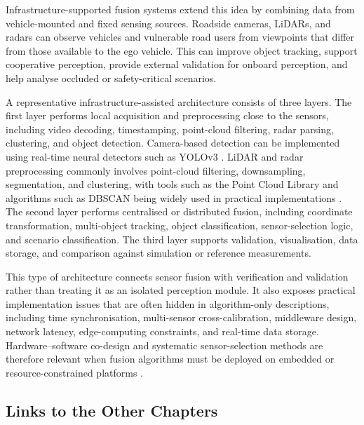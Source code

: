 Infrastructure-supported fusion systems extend this idea by combining data from vehicle-mounted and fixed sensing sources. Roadside cameras, LiDARs, and radars can observe vehicles and vulnerable road users from viewpoints that differ from those available to the ego vehicle. This can improve object tracking, support cooperative perception, provide external validation for onboard perception, and help analyse occluded or safety-critical scenarios.

A representative infrastructure-assisted architecture consists of three layers. The first layer performs local acquisition and preprocessing close to the sensors, including video decoding, timestamping, point-cloud filtering, radar parsing, clustering, and object detection. Camera-based detection can be implemented using real-time neural detectors such as YOLOv3 \cite{redmon_yolov3_2018}. LiDAR and radar preprocessing commonly involves point-cloud filtering, downsampling, segmentation, and clustering, with tools such as the Point Cloud Library and algorithms such as DBSCAN being widely used in practical implementations \cite{rusu_pcl_2011, ester1996_dbscan}. The second layer performs centralised or distributed fusion, including coordinate transformation, multi-object tracking, object classification, sensor-selection logic, and scenario classification. The third layer supports validation, visualisation, data storage, and comparison against simulation or reference measurements.

This type of architecture connects sensor fusion with verification and validation rather than treating it as an isolated perception module. It also exposes practical implementation issues that are often hidden in algorithm-only descriptions, including time synchronisation, multi-sensor cross-calibration, middleware design, network latency, edge-computing constraints, and real-time data storage. Hardware--software co-design and systematic sensor-selection methods are therefore relevant when fusion algorithms must be deployed on embedded or resource-constrained platforms \cite{deliparaschos2016_jee_fpga}.

\subsection{Links to the Other Chapters}
\label{subsec:ch05-links}

